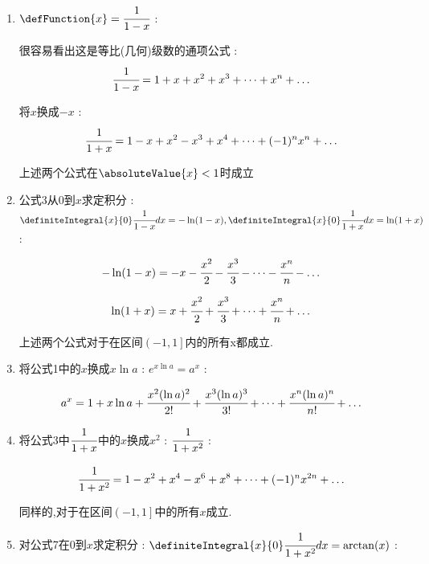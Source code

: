 {{{{{\begin{enumerate}
{          总结规律,可知 : 展开式只有奇数次项,并且正负会交替出现 :
          $$
            \sin(x) = x - \cfrac{x^3}{3!} + \cfrac{x^5}{5!} - \cfrac{x^7}{7!} + \dots + (-1)^n\cfrac{x^{2n + 1}}{(2n + 1)!} + \dots
          $$

          由$\fDerivative{x} = g(x)$,对上式求导就会得到$\cos$的展开式 :
          $$
            \cos(x) = 1 - \cfrac{x^2}{2!} + \cfrac{x^4}{4!} - \cfrac{x^6}{6!} + \dots + (-1)^n\cfrac{x^{2n}}{(2n)!} + \dots
          $$

          特点是只有偶次项.
          }
    \item {
          $\defFunction{x} = \cfrac{1}{1 - x}$ :

          很容易看出这是等比(几何)级数的通项公式 :
          $$
            \cfrac{1}{1 - x} =1 + x + x^2 + x^3 + \dots + x^n + \dots
          $$

          将$x$换成$-x$ :
          $$
            \cfrac{1}{1 + x} = 1 - x + x^2 - x^3 + x^4 + \dots + (-1)^nx^n + \dots
          $$

          上述两个公式在$\absoluteValue{x} < 1$时成立
          }
    \item{
          公式3从$0$到$x$求定积分 : $\definiteIntegral{x}{0}\cfrac{1}{1 - x}dx = -\ln(1 - x),\definiteIntegral{x}{0}\cfrac{1}{1 + x}dx = \ln(1 + x)$ :

          $$
            -\ln(1 - x) = -x - \cfrac{x^2}{2} - \cfrac{x^3}{3} - \dots - \cfrac{x^n}{n} - \dots
          $$

          $$
            \ln(1 + x) = x + \cfrac{x^2}{2} + \cfrac{x^3}{3} + \dots + \cfrac{x^n}{n} + \dots
          $$

          上述两个公式对于在区间$\left(-1,1\right]$内的所有x都成立.
          }
    \item {
          将公式1中的$x$换成$x\ln a$ : $e^{x\ln a} = a^x$ :

          $$
            a^x = 1 + x\ln a + \cfrac{x^2(\ln a)^2}{2!} + \cfrac{x^3(\ln a)^3}{3!} + \dots + \cfrac{x^n(\ln a)^n}{n!} + \dots
          $$
          }
    \item{
          将公式3中$\cfrac{1}{1 + x}$中的$x$换成$x^2$ : $\cfrac{1}{1 + x^2}$ :

          $$
            \cfrac{1}{1 + x^2} = 1 - x^2 + x^4 - x^6 + x^8 + \dots + (-1)^nx^{2n} + \dots
          $$

          同样的,对于在区间$\left(-1,1\right]$中的所有$x$成立.
          }
    \item {
          对公式7在$0$到$x$求定积分 : $\definiteIntegral{x}{0}\cfrac{1}{1 + x^2}dx = \arctan(x)$  :

}
\end{enumerate}}}}}}
